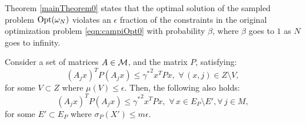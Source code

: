 Theorem \ref{mainTheorem0} states that the optimal solution of the sampled problem $\text{Opt}(\omega_N)$ violates an $\epsilon$ fraction of the constraints in the original optimization problem  \eqref{eqn:campiOpt0} with probability $\beta$, where $\beta$ goes to $1$ as $N$ goes to infinity.


\begin{theorem}\label{thm:mainTheorem01}Consider a set of matrices $A \in \mathcal{M}$, and the matrix $P$, satisfying:
\begin{equation*}(A_j x)^TP(A_j x) \leq {\gamma^*}^2x^TPx,\,\, \forall\, (x, j) \in Z \setminus V,\end{equation*}
for some $V \subset Z$ where $\mu(V) \leq \epsilon$. Then, the following also holds:
\begin{equation*}\label{eqn:thm01-2}(A_j x)^TP(A_j x) \leq {\gamma^*}^2x^TPx,\,\, \forall\, x \in E_P \setminus E', \forall\, j \in M,\end{equation*}
for some $E' \subset E_P$ where $\sigma_P(X') \leq m \epsilon$.
\end{theorem}

